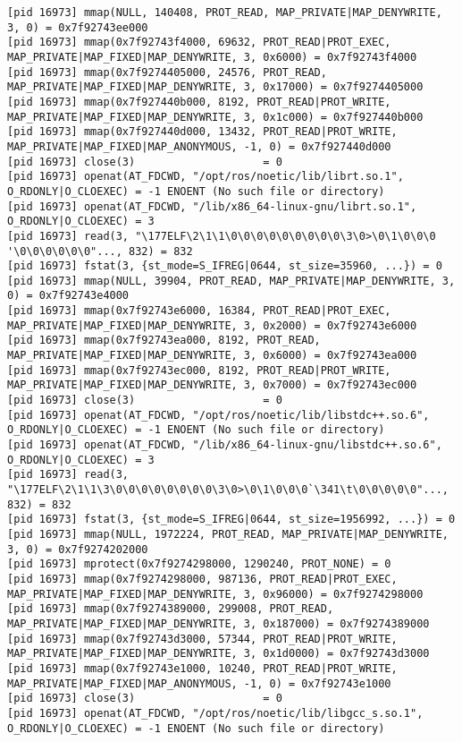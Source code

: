 \documentclass[a4paper, 12pt]{article}
\begin{document}
\begin{lstlisting}
[pid 16973] mmap(NULL, 140408, PROT_READ, MAP_PRIVATE|MAP_DENYWRITE, 3, 0) = 0x7f92743ee000
[pid 16973] mmap(0x7f92743f4000, 69632, PROT_READ|PROT_EXEC, MAP_PRIVATE|MAP_FIXED|MAP_DENYWRITE, 3, 0x6000) = 0x7f92743f4000
[pid 16973] mmap(0x7f9274405000, 24576, PROT_READ, MAP_PRIVATE|MAP_FIXED|MAP_DENYWRITE, 3, 0x17000) = 0x7f9274405000
[pid 16973] mmap(0x7f927440b000, 8192, PROT_READ|PROT_WRITE, MAP_PRIVATE|MAP_FIXED|MAP_DENYWRITE, 3, 0x1c000) = 0x7f927440b000
[pid 16973] mmap(0x7f927440d000, 13432, PROT_READ|PROT_WRITE, MAP_PRIVATE|MAP_FIXED|MAP_ANONYMOUS, -1, 0) = 0x7f927440d000
[pid 16973] close(3)                    = 0
[pid 16973] openat(AT_FDCWD, "/opt/ros/noetic/lib/librt.so.1", O_RDONLY|O_CLOEXEC) = -1 ENOENT (No such file or directory)
[pid 16973] openat(AT_FDCWD, "/lib/x86_64-linux-gnu/librt.so.1", O_RDONLY|O_CLOEXEC) = 3
[pid 16973] read(3, "\177ELF\2\1\1\0\0\0\0\0\0\0\0\0\3\0>\0\1\0\0\0 '\0\0\0\0\0\0"..., 832) = 832
[pid 16973] fstat(3, {st_mode=S_IFREG|0644, st_size=35960, ...}) = 0
[pid 16973] mmap(NULL, 39904, PROT_READ, MAP_PRIVATE|MAP_DENYWRITE, 3, 0) = 0x7f92743e4000
[pid 16973] mmap(0x7f92743e6000, 16384, PROT_READ|PROT_EXEC, MAP_PRIVATE|MAP_FIXED|MAP_DENYWRITE, 3, 0x2000) = 0x7f92743e6000
[pid 16973] mmap(0x7f92743ea000, 8192, PROT_READ, MAP_PRIVATE|MAP_FIXED|MAP_DENYWRITE, 3, 0x6000) = 0x7f92743ea000
[pid 16973] mmap(0x7f92743ec000, 8192, PROT_READ|PROT_WRITE, MAP_PRIVATE|MAP_FIXED|MAP_DENYWRITE, 3, 0x7000) = 0x7f92743ec000
[pid 16973] close(3)                    = 0
[pid 16973] openat(AT_FDCWD, "/opt/ros/noetic/lib/libstdc++.so.6", O_RDONLY|O_CLOEXEC) = -1 ENOENT (No such file or directory)
[pid 16973] openat(AT_FDCWD, "/lib/x86_64-linux-gnu/libstdc++.so.6", O_RDONLY|O_CLOEXEC) = 3
[pid 16973] read(3, "\177ELF\2\1\1\3\0\0\0\0\0\0\0\0\3\0>\0\1\0\0\0`\341\t\0\0\0\0\0"..., 832) = 832
[pid 16973] fstat(3, {st_mode=S_IFREG|0644, st_size=1956992, ...}) = 0
[pid 16973] mmap(NULL, 1972224, PROT_READ, MAP_PRIVATE|MAP_DENYWRITE, 3, 0) = 0x7f9274202000
[pid 16973] mprotect(0x7f9274298000, 1290240, PROT_NONE) = 0
[pid 16973] mmap(0x7f9274298000, 987136, PROT_READ|PROT_EXEC, MAP_PRIVATE|MAP_FIXED|MAP_DENYWRITE, 3, 0x96000) = 0x7f9274298000
[pid 16973] mmap(0x7f9274389000, 299008, PROT_READ, MAP_PRIVATE|MAP_FIXED|MAP_DENYWRITE, 3, 0x187000) = 0x7f9274389000
[pid 16973] mmap(0x7f92743d3000, 57344, PROT_READ|PROT_WRITE, MAP_PRIVATE|MAP_FIXED|MAP_DENYWRITE, 3, 0x1d0000) = 0x7f92743d3000
[pid 16973] mmap(0x7f92743e1000, 10240, PROT_READ|PROT_WRITE, MAP_PRIVATE|MAP_FIXED|MAP_ANONYMOUS, -1, 0) = 0x7f92743e1000
[pid 16973] close(3)                    = 0
[pid 16973] openat(AT_FDCWD, "/opt/ros/noetic/lib/libgcc_s.so.1", O_RDONLY|O_CLOEXEC) = -1 ENOENT (No such file or directory)

\end{lstlisting}
\end{document}
